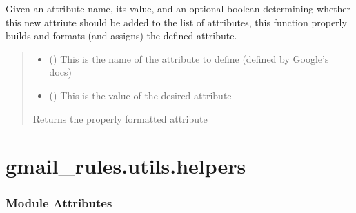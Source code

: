 \documentclass[letterpaper,10pt,english]{sphinxmanual}
\begin{document}
\begin{fulllineitems}
\begin{fulllineitems}
\label{\detokenize{_autosummary/gmail_rules.rules.move_to:gmail_rules.rules.move_to.Move_To.xml_format_rule_attribute}}
\pysigstartsignatures
{}
\pysigstopsignatures
\sphinxAtStartPar
Given an attribute name, its value, and an optional boolean determining whether this
new attriute should be added to the list of attributes, this function properly builds
and formats (and assigns) the defined attribute.
\begin{quote}\begin{description}
\begin{itemize}
\item {} 
\sphinxAtStartPar
{} () \textendash{} This is the name of the attribute to define (defined by Google’s docs)

\item {} 
\sphinxAtStartPar
{} () \textendash{} This is the value of the desired attribute

\end{itemize}

\sphinxAtStartPar
{} \textendash{} Returns the properly formatted attribute

\sphinxAtStartPar
{}

\end{description}\end{quote}

\end{fulllineitems}


\end{fulllineitems}


\sphinxstepscope


\section{gmail\_rules.utils.helpers}
\label{\detokenize{_autosummary/gmail_rules.utils.helpers:module-gmail_rules.utils.helpers}}\label{\detokenize{_autosummary/gmail_rules.utils.helpers:gmail-rules-utils-helpers}}\label{\detokenize{_autosummary/gmail_rules.utils.helpers::doc}}\subsubsection*{Module Attributes}
\end{document}

